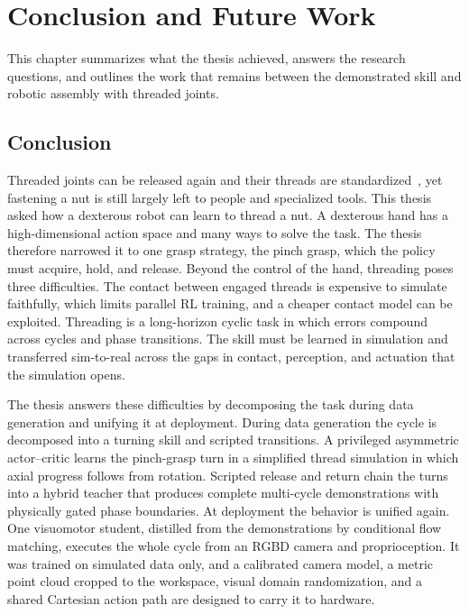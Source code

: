 \chapter{Conclusion and Future Work}\label{ch:conclusion}%

This chapter summarizes what the thesis achieved, answers the research questions, and outlines the work that remains between the demonstrated skill and robotic assembly with threaded joints.

\section{Conclusion}\label{sec:conclusion}

Threaded joints can be released again and their threads are standardized~\cite{Budynas2020}, yet fastening a nut is still largely left to people and specialized tools. This thesis asked how a dexterous robot can learn to thread a nut. A dexterous hand has a high-dimensional action space and many ways to solve the task. The thesis therefore narrowed it to one grasp strategy, the pinch grasp, which the policy must acquire, hold, and release. Beyond the control of the hand, threading poses three difficulties. The contact between engaged threads is expensive to simulate faithfully, which limits parallel \ac{RL} training, and a cheaper contact model can be exploited. Threading is a long-horizon cyclic task in which errors compound across cycles and phase transitions. The skill must be learned in simulation and transferred sim-to-real across the gaps in contact, perception, and actuation that the simulation opens.

The thesis answers these difficulties by decomposing the task during data generation and unifying it at deployment. During data generation the cycle is decomposed into a turning skill and scripted transitions. A privileged asymmetric actor--critic learns the pinch-grasp turn in a simplified thread simulation in which axial progress follows from rotation. Scripted release and return chain the turns into a hybrid teacher that produces complete multi-cycle demonstrations with physically gated phase boundaries. At deployment the behavior is unified again. One visuomotor student, distilled from the demonstrations by conditional flow matching, executes the whole cycle from an \acs{RGBD} camera and proprioception. It was trained on simulated data only, and a calibrated camera model, a metric point cloud cropped to the workspace, visual domain randomization, and a shared Cartesian action path are designed to carry it to hardware.

